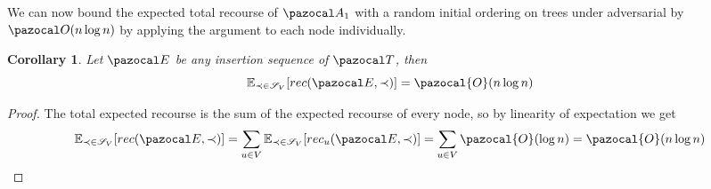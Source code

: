 \documentclass{report}
\newtheorem{corollary}{Corollary}
\begin{document}
We can now bound the expected total recourse of $\pazocal A_1$ with a random initial ordering on trees under adversarial by $\pazocal O(n \log n)$ by applying the argument to each node individually. 

\begin{corollary}
Let $\pazocal E$ be any insertion sequence of $\pazocal T$, then
\[ \mathbb{E}_{\prec \in \mathcal{S}_V}[ rec(\pazocal E, \prec)] = \pazocal{O}(n\log n) \]
\end{corollary}

\begin{proof}
The total expected recourse is the sum of the expected recourse of every node, so by linearity of expectation we get
\[ \mathbb{E}_{\prec \in \mathcal{S}_V}[ rec(\pazocal E, \prec)] = \sum_{u \in V} \mathbb{E}_{\prec \in \mathcal{S}_V}[ rec_u(\pazocal E, \prec)] = \sum_{u \in V} \pazocal{O}(\log n) = \pazocal{O}(n\log n) \]
\end{proof}
\end{document}
